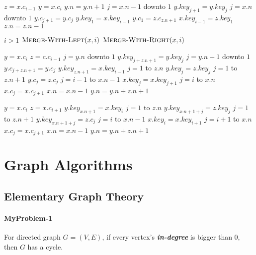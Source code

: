 \documentclass{book}
\begin{document}
\begin{CJK}{UTF8}{gkai}
\begin{codebox}
\li $z = x.c_{i-1}$
\li $y = x.c_i$
\li $y.n = y.n + 1$
\li \For $j = x.n - 1$ downto $1$
\li \Do $y.key_{j+1} = y.key_j$
\End
\li \For $j = x.n$ downto $1$
\li \Do $y.c_{j+1} = y.c_j$
\End
\li $y.key_1 = x.key_{i-1}$
\li $y.c_1 = z.c_{z.n+1}$
\li $x.key_{i-1} = z.key_1$
\li $z.n = z.n - 1$
\end{codebox}

\begin{codebox}
\li \If $i > 1$
\li \Then $\textnormal{\scshape Merge-With-Left}(x, i)$
\li \Else $\textnormal{\scshape Merge-With-Right}(x, i)$
\End
\end{codebox}

\begin{codebox}
\li $y = x.c_i$
\li $z = c.c_{i-1}$
\li \For $j = y.n$ downto $1$
\li \Do $y.key_{j+z.n+1} = y.key_j$
\End
\li \For $j = y.n+1$ downto $1$
\li \Do $y.c_{j+z.n+1} = y.c_j$
\End
\li $y.key_{z.n + 1} = x.key_{i-1}$
\li \For $j = 1$ to $z.n$
\li \Do $y.key_j = z.key_j$
\End
\li \For $j = 1$ to $z.n + 1$
\li \Do $y.c_j = z.c_j$
\End
\li \For $j = i-1$ to $x.n-1$
\li \Do $x.key_{j} = x.key_{j+1}$
\End
\li \For $j = i$ to $x.n$
\li \Do $x.c_j = x.c_{j+1}$
\End
\li $x.n = x.n - 1$
\li $y.n = y.n + z.n + 1$
\end{codebox}

\begin{codebox}
\li $y = x.c_i$
\li $z = x.c_{i+1}$
\li $y.key_{x.n + 1} = x.key_i$
\li \For $j = 1$ to $z.n$
\li \Do $y.key_{x.n + 1 + j} = z.key_j$ 
\End
\li \For $j = 1$ to $z.n + 1$
\li \Do $y.key_{x.n + 1 + j} = z.c_j$
\End
\li \For $j = i$ to $x.n-1$
\li \Do $x.key_i = x.key_{i+1}$
\End
\li \For $j = i+1$ to $x.n$
\li \Do $x.c_j = x.c_{j+1}$
\End
\li $x.n = x.n - 1$
\li $y.n = y.n + z.n + 1$
\end{codebox}


\part{Graph Algorithms}
\chapter{Elementary Graph Theory}

\subsection*{MyProblem-1}
For directed graph $G = (V, E)$, if every vertex's \textit{\textbf{in-degree}} 
is bigger than $0$, then $G$ has a cycle.


\end{CJK}
\end{document}
